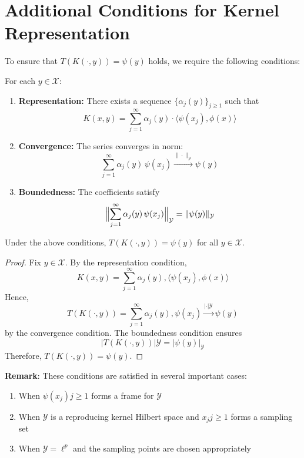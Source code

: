 \section{Additional Conditions for Kernel Representation}
To ensure that $T(K(\cdot,y)) = \psi(y)$ holds, we require the following conditions:
\begin{definition}
For each $y \in \mathcal{X}$:
\begin{enumerate}
\item \textbf{Representation:} There exists a sequence $\{\alpha_j(y)\}_{j\ge1}$ such that
\[
K(x,y) = \sum_{j=1}^\infty \alpha_j(y)\cdot \langle \psi(x_j), \phi(x)\rangle
\]
\item \textbf{Convergence:} The series converges in norm:
\[
\sum_{j=1}^\infty \alpha_j(y)\, \psi(x_j) \xrightarrow{\|\cdot\|_{\mathcal{Y}}} \psi(y)
\]

\item \textbf{Boundedness:} The coefficients satisfy
\[
\Bigl\|\sum_{j=1}^\infty \alpha_j(y)\, \psi(x_j)\Bigr\|_{\mathcal{Y}} = \|\psi(y)\|_{\mathcal{Y}}
\]
\end{enumerate}
\end{definition}
\begin{proposition}
Under the above conditions, $T(K(\cdot,y)) = \psi(y)$ for all $y \in \mathcal{X}$.
\end{proposition}
\begin{proof}
Fix $y \in \mathcal{X}$. By the representation condition,
\[
K(x,y) = \sum_{j=1}^\infty \alpha_j(y), \langle \psi(x_j), \phi(x)\rangle
\]
Hence,
\[
T(K(\cdot,y)) = \sum_{j=1}^\infty \alpha_j(y), \psi(x_j) \xrightarrow{|\cdot|{\mathcal{Y}}} \psi(y)
\]
by the convergence condition. The boundedness condition ensures
\[
|T(K(\cdot,y))|{\mathcal{Y}} = |\psi(y)|_{\mathcal{Y}}
\]
Therefore, $T(K(\cdot,y)) = \psi(y)$.
\end{proof}
\textbf{Remark}:
These conditions are satisfied in several important cases:
\begin{enumerate}
\item When ${\psi(x_j)}{j\ge1}$ forms a frame for $\mathcal{Y}$
\item When $\mathcal{Y}$ is a reproducing kernel Hilbert space and ${x_j}{j\ge1}$ forms a sampling set
\item When $\mathcal{Y} = \ell^p$ and the sampling points are chosen appropriately
\end{enumerate}


